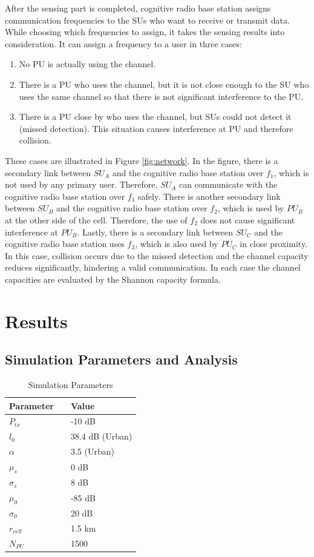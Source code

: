 \documentclass[conference,compsoc]{IEEEtran}
\newcommand{\CR}{cognitive radio }
\begin{document}
After the sensing part is completed, \CR base station assigns communication frequencies to the SUs who want to receive or transmit data. While choosing which frequencies to assign, it takes the sensing results into consideration. It can assign a frequency to a user in three cases:
\begin{enumerate}
\item No PU is actually using the channel.
\item There is a PU who uses the channel, but it is not close enough to the SU who uses the same channel so that there is not significant interference to the PU.
\item There is a PU close by who uses the channel, but SUs could not detect it (missed detection). This situation causes interference at PU and therefore collision.
\end{enumerate}

These cases are illustrated in Figure \ref{fig:network}. In the figure, there is a secondary link between $SU_A$ and the \CR base station over $f_1$, which is not used by any primary user. Therefore, $SU_A$ can communicate with the \CR base station over $f_1$ safely. There is another secondary link between $SU_B$ and the \CR base station over $f_2$, which is used by $PU_B$ at the other side of the cell. Therefore, the use of $f_2$ does not cause significant interference at $PU_B$. Lastly, there is a secondary link between $SU_C$ and the \CR base station uses $f_3$, which is also used by $PU_C$ in close proximity. In this case, collision occurs due to the missed detection and the channel capacity reduces significantly, hindering a valid communication. In each case the channel capacities are evaluated by the Shannon capacity formula.

\section{\label{sec:results}Results}
\subsection{Simulation Parameters and Analysis}

\begin{table}[!htb]
\renewcommand{\arraystretch}{1.2}
\caption{Simulation Parameters}
\label{tbl:sim_parameters}
\centering
\begin{tabular}{l c l}
  \hline
  Parameter & & Value\\
  \hline
  $P_{tx}$ & & -10 dB \\
  $l_0$    & & 38.4 dB (Urban) \\
  $\alpha$ & & 3.5 (Urban)\\
  $\mu_s$  & & 0 dB\\
  $\sigma_s$ & & 8 dB\\
  $\mu_0$  & & -85 dB \\
  $\sigma_0$ & & 20 dB \\
  $r_{cell}$ & & 1.5 km\\
  $N_{PU}$ & & 1500\\
  \hline
\end{tabular}
\end{table}
\end{document}
